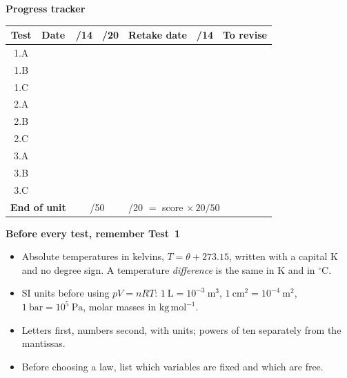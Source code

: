 \documentclass{ibetest}
\renewcommand{\arraystretch}{1.35}
\begin{document}
\newpage
\testheader
\vspace{8mm}
{\sffamily\bfseries\Large Progress tracker}\par\vspace{4mm}
\begin{center}
\renewcommand{\arraystretch}{2.1}
\begin{tabular}{|c|p{22mm}|c|c|p{22mm}|c|p{42mm}|}
\hline
\textbf{Test} & \textbf{Date} & \textbf{/14} & \textbf{/20} & \textbf{Retake date} &
\textbf{/14} & \textbf{To revise}\\ \hline
1.A & & & & & & \\ \hline
1.B & & & & & & \\ \hline
1.C & & & & & & \\ \hline
2.A & & & & & & \\ \hline
2.B & & & & & & \\ \hline
2.C & & & & & & \\ \hline
3.A & & & & & & \\ \hline
3.B & & & & & & \\ \hline
3.C & & & & & & \\ \hline\hline
\multicolumn{2}{|l|}{\textbf{End of unit}} & \multicolumn{2}{c|}{\hspace{6mm}/50} &
\multicolumn{3}{l|}{\quad /20 $=$ score $\times\,20/50$} \\ \hline
\end{tabular}
\end{center}
\vspace{6mm}
{\sffamily\bfseries Before every test, remember Test~1}
\begin{itemize}[leftmargin=7mm, itemsep=2pt]
  \item Absolute temperatures in kelvins, $T = \theta + 273.15$, written with a capital K
        and no degree sign. A temperature \emph{difference} is the same in K and in $^\circ$C.
  \item SI units before using $pV = nRT$: $1\ \mathrm L = 10^{-3}\ \mathrm{m^3}$,
        $1\ \mathrm{cm^2} = 10^{-4}\ \mathrm{m^2}$, $1\ \mathrm{bar} = 10^{5}\ \mathrm{Pa}$,
        molar masses in $\mathrm{kg\,mol^{-1}}$.
  \item Letters first, numbers second, with units; powers of ten separately from the mantissas.
  \item Before choosing a law, list which variables are fixed and which are free.
\end{itemize}
\end{document}
